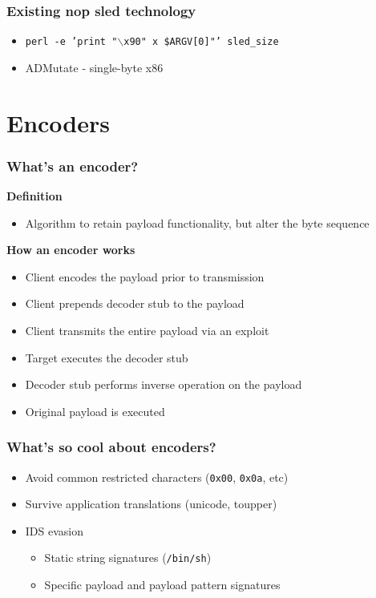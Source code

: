 \documentclass{beamer}
\newenvironment{sitemize}{\vspace{1mm}\begin{itemize}\itemsep 4pt\small}{\end{itemize}}
\begin{document}
\begin{frame}[t]
    \frametitle{Existing nop sled technology}

    \begin{sitemize}
        \item \footnotesize{\texttt{perl -e 'print "$\backslash$x90" x \$ARGV[0]"'
            sled\_size}}
        \item ADMutate - single-byte x86
    \end{sitemize}
\end{frame}

\section{Encoders}


\begin{frame}[t]
    \frametitle{What's an encoder?}

    \textbf{Definition}
    \begin{sitemize}
        \item Algorithm to retain payload functionality, but alter the byte sequence
    \end{sitemize}

    \pause
    \textbf{How an encoder works}
    \begin{sitemize}
        \pause
        \item Client encodes the payload prior to transmission
        \pause
        \item Client prepends decoder stub to the payload
        \pause
        \item Client transmits the entire payload via an exploit
        \pause
        \item Target executes the decoder stub
        \pause
        \item Decoder stub performs inverse operation on the payload
        \pause
        \item Original payload is executed
    \end{sitemize}
\end{frame}

\begin{frame}[t]
    \frametitle{What's so cool about encoders?}

    \begin{sitemize}
        \item Avoid common restricted characters
            (\texttt{0x00}, \texttt{0x0a}, etc)
	\item Survive application translations (unicode, toupper)

        \pause
        \item IDS evasion
        \begin{sitemize}
            \item Static string signatures
            (\texttt{/bin/sh})
            \item Specific payload and payload pattern signatures
        \end{sitemize}
    \end{sitemize}
\end{frame}
\end{document}
